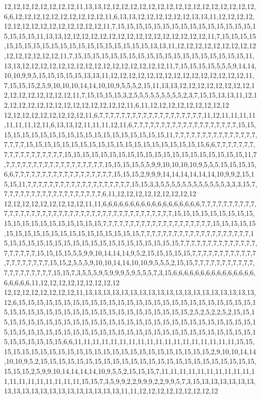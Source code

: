 12,12,12,12,12,12,12,12,11,13,13,12,12,12,12,12,12,12,12,12,12,12,12,12,12,12,12,12,6,6,12,12,12,12,12,12,12,12,12,12,11,6,13,13,12,12,12,12,12,12,13,13,11,12,12,12,12,12,12,12,12,12,12,12,12,12,12,12,11,7,15,15,15,15,15,15,15,15,15,15,15,15,15,15,15,15,15,15,15,11,13,13,12,12,12,12,12,12,12,12,12,12,12,12,12,12,12,12,11,7,15,15,15,15,15,15,15,15,15,15,15,15,15,15,15,15,15,15,15,15,13,13,11,12,12,12,12,12,12,12,12,12,12,12,12,12,12,12,11,7,15,15,15,15,15,15,15,15,15,15,15,15,15,15,15,15,15,15,15,11,13,13,12,12,12,12,12,12,12,12,12,12,12,12,12,12,12,12,11,7,15,15,15,15,5,5,5,9,14,14,10,10,9,9,5,15,15,15,15,15,13,13,11,12,12,12,12,12,12,12,12,12,12,12,12,12,12,12,11,7,15,15,15,2,5,9,10,10,10,14,14,10,10,9,5,5,5,2,15,11,13,13,12,12,12,12,12,12,12,12,12,12,12,12,12,12,12,12,11,7,15,15,15,15,3,2,5,5,5,5,5,5,5,5,5,2,3,7,15,15,13,13,11,12,12,12,12,12,12,12,12,12,12,12,12,12,12,12,11,6,11,12,12,12,12,12,12,12,12,12
12,12,12,12,12,12,12,12,12,11,6,7,7,7,7,7,7,7,7,7,7,7,7,7,7,7,7,7,7,7,11,12,11,11,11,11,11,11,11,12,11,6,13,13,12,11,11,11,12,11,6,7,7,7,7,7,7,7,7,7,7,7,7,7,7,7,7,7,7,7,15,15,15,15,15,15,15,15,15,15,15,15,15,15,15,15,15,15,15,15,11,7,7,7,7,7,7,7,7,7,7,7,7,7,7,7,7,7,7,7,15,15,15,15,15,15,15,15,15,15,15,15,15,15,15,15,15,15,15,15,6,6,7,7,7,7,7,7,7,7,7,7,7,7,7,7,7,7,7,7,15,15,15,15,15,15,15,15,15,15,15,15,15,15,15,15,15,15,15,15,11,7,7,7,7,7,7,7,7,7,7,7,7,7,7,7,7,7,7,7,15,15,15,15,5,5,9,9,10,10,10,10,9,5,5,5,15,15,15,15,6,6,7,7,7,7,7,7,7,7,7,7,7,7,7,7,7,7,7,7,15,15,15,2,9,9,9,14,14,14,14,14,14,10,9,9,2,15,15,15,11,7,7,7,7,7,7,7,7,7,7,7,7,7,7,7,7,7,7,7,15,15,3,3,5,5,5,5,5,5,5,5,5,5,5,5,3,3,3,15,7,7,7,7,7,7,7,7,7,7,7,7,7,7,7,7,7,7,7,6,11,12,12,12,12,12,12,12,12,12
12,12,12,12,12,12,12,12,12,11,11,6,6,6,6,6,6,6,6,6,6,6,6,6,6,6,6,6,6,7,7,7,7,7,7,7,7,7,7,7,7,7,7,7,7,7,7,7,7,7,7,7,7,7,7,7,7,7,7,7,7,7,7,7,7,7,7,7,7,7,15,15,15,15,15,15,15,15,15,15,15,15,15,15,15,15,15,15,15,15,7,7,7,7,7,7,7,7,7,7,7,7,7,7,7,7,7,7,7,7,15,15,15,15,15,15,15,15,15,15,15,15,15,15,15,15,15,15,15,15,7,7,7,7,7,7,7,7,7,7,7,7,7,7,7,7,7,7,7,7,15,15,15,15,15,15,15,15,15,15,15,15,15,15,15,15,15,15,15,15,7,7,7,7,7,7,7,7,7,7,7,7,7,7,7,7,7,7,7,7,15,15,15,15,5,5,9,9,10,14,14,14,9,5,2,15,15,15,15,15,7,7,7,7,7,7,7,7,7,7,7,7,7,7,7,7,7,7,7,7,15,15,2,5,5,5,9,10,10,14,14,10,10,9,5,5,5,2,15,15,7,7,7,7,7,7,7,7,7,7,7,7,7,7,7,7,7,7,7,7,15,15,7,3,5,5,5,9,5,9,9,9,5,9,5,5,5,7,3,15,6,6,6,6,6,6,6,6,6,6,6,6,6,6,6,6,6,6,6,6,11,12,12,12,12,12,12,12,12,12
12,12,12,12,12,12,12,12,11,13,13,13,13,13,13,13,13,13,13,13,13,13,13,13,13,13,13,13,12,6,15,15,15,15,15,15,15,15,15,15,15,15,15,15,15,15,15,15,15,15,15,15,15,15,15,15,15,15,15,15,15,15,15,15,15,15,15,15,15,15,15,15,15,15,15,15,15,2,5,2,5,2,2,5,2,15,15,15,15,15,15,15,15,15,15,15,15,15,15,15,15,15,15,15,15,15,15,15,15,15,15,15,15,15,15,15,15,15,15,15,15,15,15,15,15,15,15,15,15,15,15,15,15,15,15,15,15,15,15,15,15,15,15,15,15,15,15,15,15,15,6,6,11,11,11,11,11,11,11,11,11,11,11,11,11,11,11,11,11,11,15,15,15,15,15,15,15,15,15,15,15,15,15,15,15,15,15,15,15,15,15,15,15,15,15,2,9,10,10,14,14,10,10,9,5,2,15,15,15,15,15,15,15,15,15,15,15,15,15,15,15,15,15,15,15,15,15,15,15,15,15,15,15,2,5,9,9,10,14,14,14,14,10,9,5,5,2,15,15,15,7,11,11,11,11,11,11,11,11,11,11,11,11,11,11,11,11,11,11,11,15,15,7,3,5,9,9,2,2,9,9,9,2,2,9,9,5,7,3,15,13,13,13,13,13,13,13,13,13,13,13,13,13,13,13,13,13,13,13,11,11,12,12,12,12,12,12,12,12,12
